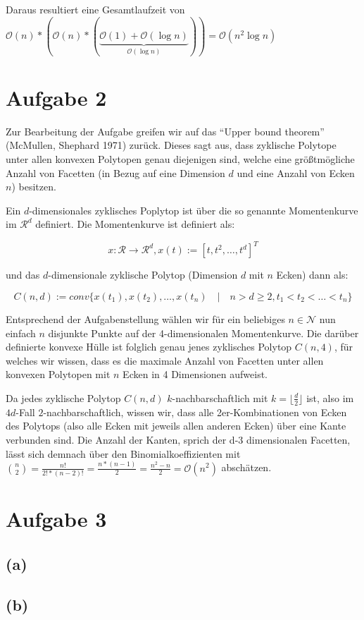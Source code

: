 \documentclass[a4paper]{article}
\begin{document}
 Daraus resultiert eine Gesamtlaufzeit von $\mathcal{O}(n) * (\mathcal{O}(n) * (\underbrace{\mathcal{O}(1) + \mathcal{O}(\log n)}_{\mathcal{O}(\log n)})) = \mathcal{O}(n^2 \log n)$



\section*{Aufgabe 2}

Zur Bearbeitung der Aufgabe greifen wir auf das "`Upper bound theorem"' (McMullen, Shephard 1971) zurück.
Dieses sagt aus, dass zyklische Polytope unter allen konvexen Polytopen genau diejenigen sind, welche eine größtmögliche Anzahl von Facetten (in Bezug auf eine Dimension $d$ und eine Anzahl von
Ecken $n$) besitzen.

Ein $d$-dimensionales zyklisches Poplytop ist über die so genannte Momentenkurve im $\mathcal{R}^d$ definiert. Die Momentenkurve ist definiert als:

$$x: \mathcal{R} \rightarrow \mathcal{R}^d, x(t) := [t, t^2, \dots, t^d]^T$$

und das $d$-dimensionale zyklische Polytop (Dimension $d$ mit $n$ Ecken) dann als:

$$C(n,d) := conv\{x(t_1), x(t_2), \dots, x(t_n) \quad|\quad n > d \geq 2, t_1 < t_2 < \dots < t_n\}$$

Entsprechend der Aufgabenstellung wählen wir für ein beliebiges $n \in \mathcal{N}$ nun
einfach $n$ disjunkte Punkte auf der 4-dimensionalen Momentenkurve. 
Die darüber definierte konvexe Hülle ist folglich genau jenes zyklisches Polytop $C(n,4)$, 
für welches wir wissen, dass es die maximale Anzahl von Facetten unter allen konvexen Polytopen
mit $n$ Ecken in 4 Dimensionen aufweist. 

Da jedes zyklische Polytop $C(n,d)$ $k$-nachbarschaftlich mit $k = \lfloor\frac{d}{2}\rfloor $ ist, also im $4
d$-Fall
$2$-nachbarschaftlich, wissen wir, dass alle 2er-Kombinationen von Ecken des Polytops
(also alle Ecken mit jeweils allen anderen Ecken) über eine Kante verbunden sind. Die Anzahl der Kanten, sprich der d-3 dimensionalen
Facetten, lässt sich demnach über den Binomialkoeffizienten mit $\binom{n}{2} = \frac{n!}{2! * (n-2)!}
= \frac{n * (n-1)}{2} = \frac{n^2 - n}{2} = \mathcal{O}(n^2)$ abschätzen. 

\section*{Aufgabe 3}
\subsection*{(a)}
\subsection*{(b)}
\end{document}
